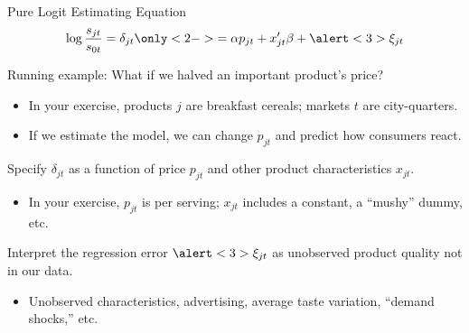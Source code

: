 \documentclass[aspectratio=169,t,11pt,table]{beamer}
\begin{document}
\begin{frame}{Pure Logit Estimating Equation}
    \vspace{-\baselineskip}
    \begin{equation*}
        \log\frac{s_{jt}}{s_{0t}} = \delta_{jt} \only<2->{= \alpha p_{jt} + x_{jt}'\beta + \alert<3>{\xi_{jt}}}
    \end{equation*}
    \vspace{-0.5\baselineskip}
    \begin{wideitemize}
        \item Running example: What if we halved an important product's price?
        \begin{itemize}
            \item In your exercise, products $j$ are breakfast cereals; markets $t$ are city-quarters.
            \item If we estimate the model, we can change $p_{jt}$ and predict how consumers react.
        \end{itemize}
        \pause
        \item Specify $\delta_{jt}$ as a function of price $p_{jt}$ and other product characteristics $x_{jt}$.
        \begin{itemize}
            \item In your exercise, $p_{jt}$ is per serving; $x_{jt}$ includes a constant, a ``mushy'' dummy, etc.
        \end{itemize}
        \pause
        \item Interpret the regression error $\alert<3>{\xi_{jt}}$ as unobserved product quality not in our data.
        \begin{itemize}
            \item Unobserved characteristics, advertising, average taste variation, ``demand shocks,'' etc.
        \end{itemize}
    \end{wideitemize}
\end{frame}
\end{document}
